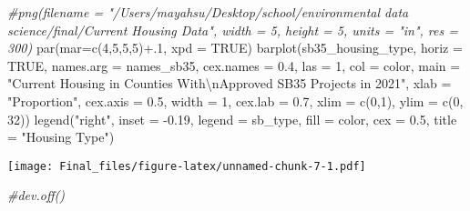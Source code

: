 \documentclass[
]{article}
\newenvironment{Shaded}{\begin{snugshade}}{\end{snugshade}}
\newcommand{\AttributeTok}[1]{\textcolor[rgb]{0.77,0.63,0.00}{#1}}
\newcommand{\CommentTok}[1]{\textcolor[rgb]{0.56,0.35,0.01}{\textit{#1}}}
\newcommand{\ConstantTok}[1]{\textcolor[rgb]{0.00,0.00,0.00}{#1}}
\newcommand{\DecValTok}[1]{\textcolor[rgb]{0.00,0.00,0.81}{#1}}
\newcommand{\FloatTok}[1]{\textcolor[rgb]{0.00,0.00,0.81}{#1}}
\newcommand{\FunctionTok}[1]{\textcolor[rgb]{0.00,0.00,0.00}{#1}}
\newcommand{\NormalTok}[1]{#1}
\newcommand{\SpecialCharTok}[1]{\textcolor[rgb]{0.00,0.00,0.00}{#1}}
\newcommand{\StringTok}[1]{\textcolor[rgb]{0.31,0.60,0.02}{#1}}
\begin{document}
\begin{Shaded}
\begin{Highlighting}[]
\CommentTok{\#png(filename = "/Users/mayahsu/Desktop/school/environmental data science/final/Current Housing Data", width = 5, height = 5, units = "in", res = 300)}
\FunctionTok{par}\NormalTok{(}\AttributeTok{mar=}\FunctionTok{c}\NormalTok{(}\DecValTok{4}\NormalTok{,}\DecValTok{5}\NormalTok{,}\DecValTok{5}\NormalTok{,}\DecValTok{5}\NormalTok{)}\SpecialCharTok{+}\NormalTok{.}\DecValTok{1}\NormalTok{, }\AttributeTok{xpd =} \ConstantTok{TRUE}\NormalTok{)}
\FunctionTok{barplot}\NormalTok{(sb35\_housing\_type, }\AttributeTok{horiz =} \ConstantTok{TRUE}\NormalTok{, }\AttributeTok{names.arg =}\NormalTok{ names\_sb35, }\AttributeTok{cex.names =} \FloatTok{0.4}\NormalTok{, }\AttributeTok{las =} \DecValTok{1}\NormalTok{, }\AttributeTok{col =}\NormalTok{ color, }\AttributeTok{main =} \StringTok{"Current Housing in Counties With}\SpecialCharTok{\textbackslash{}n}\StringTok{Approved SB35 Projects in 2021"}\NormalTok{, }\AttributeTok{xlab =} \StringTok{"Proportion"}\NormalTok{, }\AttributeTok{cex.axis =} \FloatTok{0.5}\NormalTok{, }\AttributeTok{width =} \DecValTok{1}\NormalTok{, }\AttributeTok{cex.lab =} \FloatTok{0.7}\NormalTok{, }\AttributeTok{xlim =} \FunctionTok{c}\NormalTok{(}\DecValTok{0}\NormalTok{,}\DecValTok{1}\NormalTok{), }\AttributeTok{ylim =} \FunctionTok{c}\NormalTok{(}\DecValTok{0}\NormalTok{, }\DecValTok{32}\NormalTok{))}
\FunctionTok{legend}\NormalTok{(}\StringTok{"right"}\NormalTok{, }\AttributeTok{inset =} \SpecialCharTok{{-}}\FloatTok{0.19}\NormalTok{, }\AttributeTok{legend =}\NormalTok{ sb\_type, }\AttributeTok{fill =}\NormalTok{ color, }\AttributeTok{cex =} \FloatTok{0.5}\NormalTok{, }\AttributeTok{title =} \StringTok{"Housing Type"}\NormalTok{)}
\end{Highlighting}
\end{Shaded}

\texttt{[image: Final\_files/figure-latex/unnamed-chunk-7-1.pdf]}

\begin{Shaded}
\begin{Highlighting}[]
\CommentTok{\#dev.off()}
\end{Highlighting}
\end{Shaded}
\end{document}
